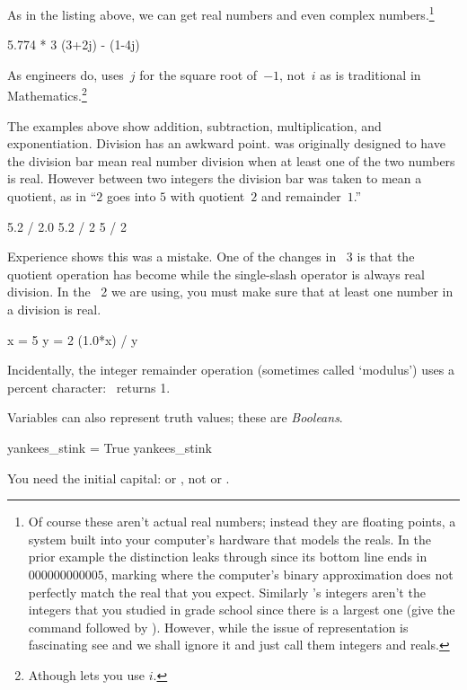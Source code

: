 As in the listing above, we can get real 
numbers 
and even complex numbers.\footnote{Of course these aren't actual 
real numbers; instead they are floating points, a system 
built into your computer's hardware that
models the reals.
In the prior example the distinction leaks through
since its bottom line ends in $000000000005$, marking where
the computer's binary approximation does not perfectly match
the real that you expect.
Similarly \protect\python's integers aren't the integers that you studied
in grade school since there is a largest one (give \python{} the 
command \protect{} followed by 
\protect{}). 
However, while the issue of representation is fascinating\protect\Dash
see \protect\cite{PythonTeam12a} and \protect\cite{Goldberg91}\protect\Dash
we shall ignore it and just call them integers and reals.}
\begin{pythonconsole}
5.774 * 3
(3+2j) - (1-4j)
\end{pythonconsole}
\noindent As engineers do, \python{} uses~$j$ for the square
root of~$-1$, not~$i$ as is traditional in Mathematics.\footnote{Athough
\protect\Sage{} lets you use $i$.}

The examples above show addition, subtraction, multiplication, 
and exponentiation. 
Division has an awkward point.
\python{} was originally designed to have the division bar
\inlinecode{/} mean real number division 
when at least one of the two numbers is real.
However between two integers the division bar was taken to mean 
a quotient, as in ``$2$ goes into $5$ with quotient~$2$ and remainder~$1$.''
\begin{pythonconsole}
5.2 / 2.0
5.2 / 2
5 / 2
\end{pythonconsole}
Experience shows this was a mistake. 
One of the changes in \python~3
is that the quotient operation has become \inlinecode{//}
while the single-slash operator is always real division.
In the \python~2 we are using, you must make sure that at least one
number in a division is real.
\begin{pythonconsole}
x = 5
y = 2
(1.0*x) / y
\end{pythonconsole}
\noindent Incidentally, 
the integer remainder operation (sometimes called `modulus')  
uses a percent character:~ returns 1.

Variables can also represent truth values; these are \textit{Booleans}.
\begin{pythonconsole}
yankees_stink = True
yankees_stink
\end{pythonconsole}
\noindent You need the initial capital:
or , not
or .
 
